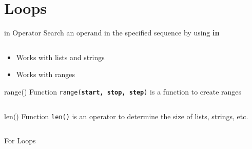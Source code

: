     \section{Loops}
        \begin{frame}{in Operator}
            Search an operand in the specified sequence by using \textbf{in}
            \bigskip
            \inputminted[frame=single,framesep=2pt]{python3}{code-examples/in_operator.py}
            \begin{itemize}
                \item Works with lists and strings
                \item Works with ranges
            \end{itemize}
        \end{frame}
        \begin{frame}{range() Function}
            \texttt{range(\textbf{start, stop, step})} is a function to create ranges
            \bigskip
            \inputminted[frame=single,framesep=2pt]{python3}{code-examples/range.py}
        \end{frame}
        \begin{frame}{len() Function}
            \texttt{len()} is an operator to determine the size of lists, strings, etc.
            \bigskip
            \inputminted[frame=single,framesep=2pt]{python3}{code-examples/length.py}
        \end{frame}
        \begin{frame}{For Loops}
            \begin{columns}
                \begin{column}{0.5\textwidth}
                    \inputminted[frame=single,framesep=2pt]{python3}{code-examples/for1.py}
                \end{column}
               \pause 
                \begin{column}{0.5\textwidth}
                    \inputminted[frame=single,framesep=2pt]{python3}{code-examples/for2.py}
                    \pause
                    \inputminted[frame=single,framesep=2pt]{python3}{code-examples/for3.py}
                    \pause
                    \inputminted[frame=single,framesep=2pt]{python3}{code-examples/for4.py}
                \end{column} 
            \end{columns}
        \end{frame}
        
